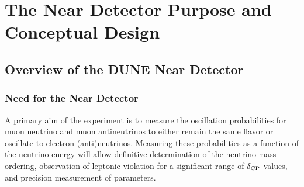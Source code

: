 \appendix
{}

\chapter{The Near Detector Purpose and Conceptual Design}

\label{ch:appx-nd}

\section{Overview of the DUNE Near Detector}
\label{sec:appx-nd-overview}


\subsection{Need for the Near Detector}
\label{sec:appx-nd:BriefOverview-need}

A primary aim of the  experiment is to measure the oscillation probabilities for muon neutrino and muon antineutrinos to either remain the same flavor or oscillate to electron (anti)neutrinos. 
Measuring these probabilities as a function of the neutrino energy will allow definitive determination of the neutrino mass ordering, observation of leptonic  violation for a significant range of $\delta_{\rm{CP}}$ values, and precision measurement of  parameters.

